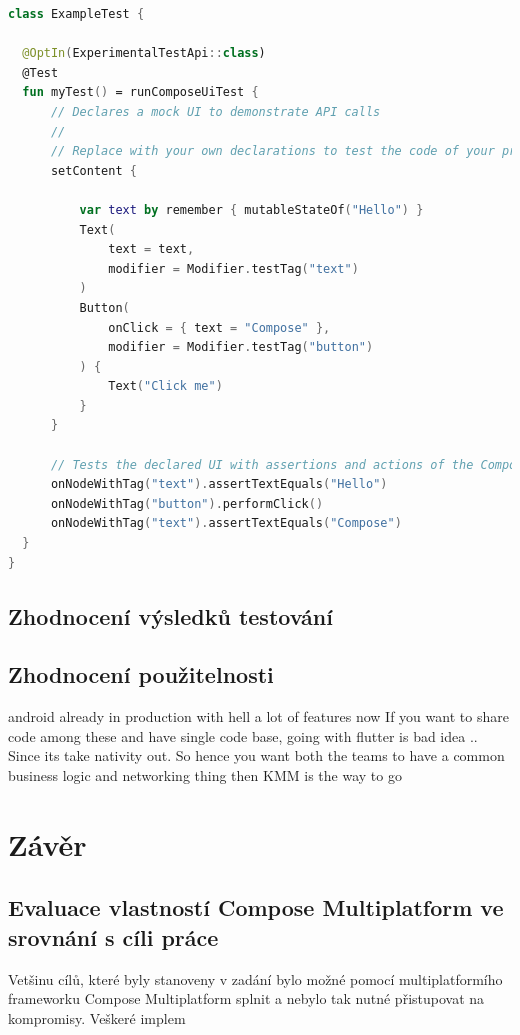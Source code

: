 
\begin{lstlisting}[caption={Implementace UI testu}, label={lst:testImplementation}, language=Kotlin]
  class ExampleTest {

  @OptIn(ExperimentalTestApi::class)
  @Test
  fun myTest() = runComposeUiTest {
      // Declares a mock UI to demonstrate API calls
      //
      // Replace with your own declarations to test the code of your project
      setContent {

          var text by remember { mutableStateOf("Hello") }
          Text(
              text = text,
              modifier = Modifier.testTag("text")
          )
          Button(
              onClick = { text = "Compose" },
              modifier = Modifier.testTag("button")
          ) {
              Text("Click me")
          }
      }

      // Tests the declared UI with assertions and actions of the Compose Multiplatform testing API
      onNodeWithTag("text").assertTextEquals("Hello")
      onNodeWithTag("button").performClick()
      onNodeWithTag("text").assertTextEquals("Compose")
  }
}
\end{lstlisting}



\section{Zhodnocení výsledků testování}

\section{Zhodnocení použitelnosti}

android already in production with hell a lot of features now If you want to share code among these and have single code base, going with flutter is bad idea .. Since its take nativity out. So hence you want both the teams to have a common business logic and networking thing then KMM is the way to go 

\chapter{Závěr}

\section{Evaluace vlastností Compose Multiplatform ve srovnání s cíli práce}
Vetšinu cílů, které byly stanoveny v zadání bylo možné pomocí multiplatformího frameworku Compose Multiplatform splnit a nebylo tak
nutné přistupovat na kompromisy. Veškeré implem

